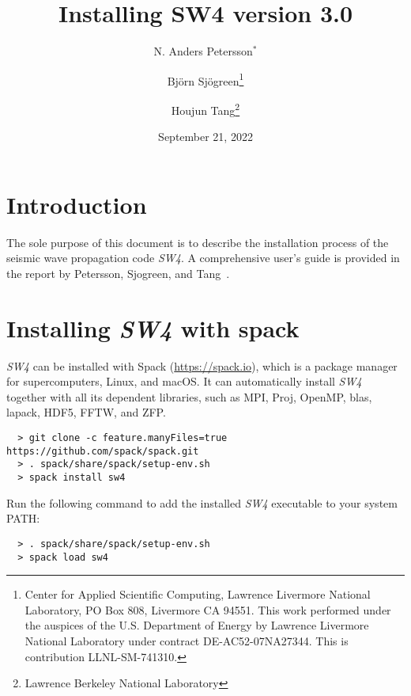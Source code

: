\documentclass[11pt]{article}
\begin{document}
\title{Installing SW4 version 3.0}

\author{ N. Anders Petersson$^*$ \and Bj\"orn Sj\"ogreen\thanks{Center for Applied Scientific
    Computing, Lawrence Livermore National Laboratory, PO Box 808, Livermore CA 94551. This work
    performed under the auspices of the U.S. Department of Energy by Lawrence Livermore National
    Laboratory under contract DE-AC52-07NA27344. This is contribution
    LLNL-SM-741310.} 
\and Houjun Tang\thanks{ Lawrence Berkeley National Laboratory}
    }
\date{September 21, 2022}
\maketitle




\tableofcontents

\section{Introduction}
The sole purpose of this document is to describe the installation process of the seismic wave
propagation code \emph{SW4}. A comprehensive user's guide is provided in the report by
Petersson, Sjogreen, and Tang~\cite{SW4-v3}.

\section{Installing \emph{SW4} with spack}\label{cha:installing-sw4-spack}
\emph{SW4} can be installed with Spack (\url{https://spack.io}), which is a package manager for supercomputers, Linux, and macOS. It can automatically install \emph{SW4} together with all its dependent libraries, such as MPI, Proj, OpenMP, blas, lapack, HDF5, FFTW, and ZFP. 
\begin{verbatim}
  > git clone -c feature.manyFiles=true https://github.com/spack/spack.git
  > . spack/share/spack/setup-env.sh
  > spack install sw4
\end{verbatim}

Run the following command to add the installed \emph{SW4} executable to your system PATH:
\begin{verbatim}
  > . spack/share/spack/setup-env.sh
  > spack load sw4
\end{verbatim}
\end{document}
